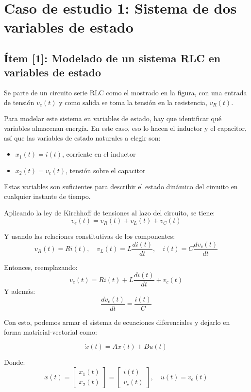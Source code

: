 \documentclass{article}
\begin{document}
\section{Caso de estudio 1: Sistema de dos variables de estado}
\subsection*{Ítem [1]: Modelado de un sistema RLC en variables de estado}

Se parte de un circuito serie RLC como el mostrado en la figura, con una entrada de tensión $v_e(t)$ y como salida se toma la tensión en la resistencia, $v_R(t)$.

Para modelar este sistema en variables de estado, hay que identificar qué variables almacenan energía. En este caso, eso lo hacen el inductor y el capacitor, así que las variables de estado naturales a elegir son:

\begin{itemize}
    \item $x_1(t) = i(t)$, corriente en el inductor
    \item $x_2(t) = v_c(t)$, tensión sobre el capacitor
\end{itemize}

Estas variables son suficientes para describir el estado dinámico del circuito en cualquier instante de tiempo.

Aplicando la ley de Kirchhoff de tensiones al lazo del circuito, se tiene:
\[
v_e(t) = v_R(t) + v_L(t) + v_C(t)
\]

Y usando las relaciones constitutivas de los componentes:
\[
v_R(t) = Ri(t), \quad v_L(t) = L\frac{di(t)}{dt}, \quad i(t) = C\frac{dv_c(t)}{dt}
\]

Entonces, reemplazando:
\[
v_e(t) = R i(t) + L \frac{di(t)}{dt} + v_c(t)
\]
Y además:
\[
\frac{dv_c(t)}{dt} = \frac{i(t)}{C}
\]

Con esto, podemos armar el sistema de ecuaciones diferenciales y dejarlo en forma matricial-vectorial como:

\[
\dot{x}(t) = A x(t) + B u(t)
\]

Donde:
\[
x(t) =
\begin{bmatrix}
x_1(t) \\
x_2(t)
\end{bmatrix}
=
\begin{bmatrix}
i(t) \\
v_c(t)
\end{bmatrix},
\quad
u(t) = v_e(t)
\]
\end{document}
